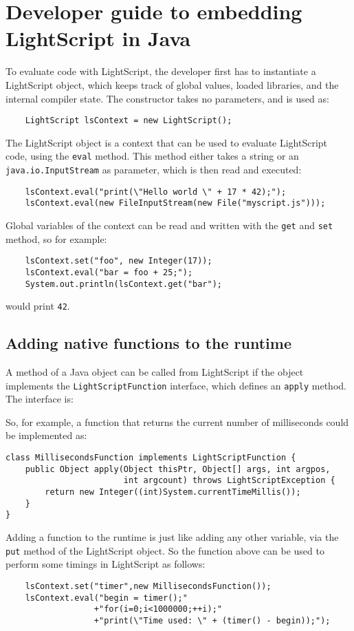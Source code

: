 \documentclass[11pt]{report}
\begin{document}
\section{Developer guide to embedding LightScript in Java}
To evaluate code with LightScript, the developer first has to instantiate a LightScript object, which keeps track of global values, loaded libraries, and the internal compiler state. The constructor takes no parameters, and is used as:
\begin{lstlisting}
    LightScript lsContext = new LightScript();
\end{lstlisting}
The LightScript object is a context that can be used to evaluate LightScript code, using the \verb|eval| method. This method either takes a string or an \verb|java.io.InputStream| as parameter, which is then read and executed:
\begin{lstlisting}
    lsContext.eval("print(\"Hello world \" + 17 * 42);");
    lsContext.eval(new FileInputStream(new File("myscript.js")));
\end{lstlisting}
Global variables of the context can be read and written with the \verb|get| and \verb|set| method, so for example:
\begin{lstlisting}
    lsContext.set("foo", new Integer(17));
    lsContext.eval("bar = foo + 25;");
    System.out.println(lsContext.get("bar");
\end{lstlisting}
would print \verb|42|.

\subsection{Adding native functions to the runtime}

A method of a Java object can be called from LightScript if the object implements the \verb|LightScriptFunction| interface, which defines an \verb|apply| method.
The interface is:

So, for example, a function that returns the current number of milliseconds could be implemented as:
\begin{lstlisting}
class MillisecondsFunction implements LightScriptFunction {
    public Object apply(Object thisPtr, Object[] args, int argpos, 
                        int argcount) throws LightScriptException {
        return new Integer((int)System.currentTimeMillis());
    }
}
\end{lstlisting}

Adding a function to the runtime is just like adding any other variable,
via the \verb|put| method of the LightScript object.
So the function above can be used to perform some timings in LightScript as follows:
\begin{lstlisting}
    lsContext.set("timer",new MillisecondsFunction());
    lsContext.eval("begin = timer();"
                  +"for(i=0;i<1000000;++i);"
                  +"print(\"Time used: \" + (timer() - begin));");
\end{lstlisting}
\end{document}
